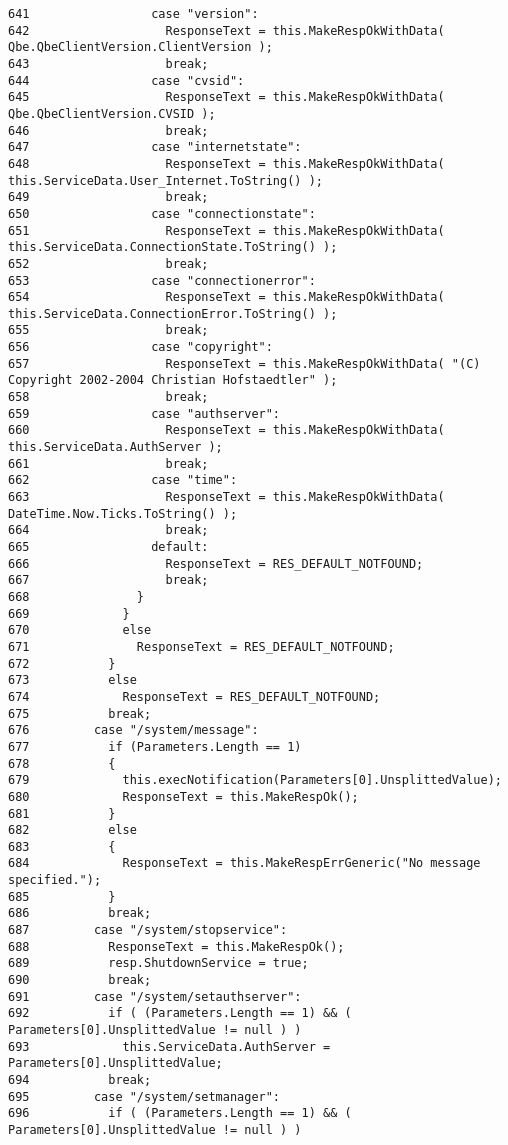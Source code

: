 \begin{verbatim}
641                 case "version":
642                   ResponseText = this.MakeRespOkWithData( Qbe.QbeClientVersion.ClientVersion );
643                   break;
644                 case "cvsid":
645                   ResponseText = this.MakeRespOkWithData( Qbe.QbeClientVersion.CVSID );
646                   break;
647                 case "internetstate":
648                   ResponseText = this.MakeRespOkWithData( this.ServiceData.User_Internet.ToString() );
649                   break;
650                 case "connectionstate":
651                   ResponseText = this.MakeRespOkWithData( this.ServiceData.ConnectionState.ToString() );
652                   break;
653                 case "connectionerror":
654                   ResponseText = this.MakeRespOkWithData( this.ServiceData.ConnectionError.ToString() );
655                   break;
656                 case "copyright":
657                   ResponseText = this.MakeRespOkWithData( "(C) Copyright 2002-2004 Christian Hofstaedtler" );
658                   break;
659                 case "authserver":
660                   ResponseText = this.MakeRespOkWithData( this.ServiceData.AuthServer );
661                   break;
662                 case "time":
663                   ResponseText = this.MakeRespOkWithData( DateTime.Now.Ticks.ToString() );
664                   break;
665                 default:
666                   ResponseText = RES_DEFAULT_NOTFOUND;
667                   break;
668               }
669             }
670             else 
671               ResponseText = RES_DEFAULT_NOTFOUND;
672           } 
673           else 
674             ResponseText = RES_DEFAULT_NOTFOUND;
675           break;
676         case "/system/message":
677           if (Parameters.Length == 1)
678           {
679             this.execNotification(Parameters[0].UnsplittedValue);
680             ResponseText = this.MakeRespOk();
681           } 
682           else 
683           {
684             ResponseText = this.MakeRespErrGeneric("No message specified.");
685           }
686           break;
687         case "/system/stopservice":
688           ResponseText = this.MakeRespOk();
689           resp.ShutdownService = true;
690           break;
691         case "/system/setauthserver":
692           if ( (Parameters.Length == 1) && ( Parameters[0].UnsplittedValue != null ) ) 
693             this.ServiceData.AuthServer = Parameters[0].UnsplittedValue;
694           break;
695         case "/system/setmanager":
696           if ( (Parameters.Length == 1) && ( Parameters[0].UnsplittedValue != null ) ) 

\end{verbatim}
